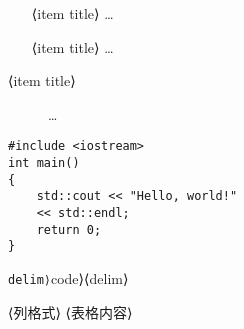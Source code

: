 \documentclass{ctexart}
\begin{document}


\begin{enumerate}
\item[⟨item title⟩] …
\end{enumerate}


\begin{itemize}
\item[⟨item title⟩] …
\end{itemize}

\begin{description}
\item[⟨item title⟩] …
\end{description}

\begin{flushleft}
\end{flushleft}

\begin{flushright}
\end{flushright}

\begin{center}
\end{center}

\begin{quote}
\end{quote}

\begin{quotation}
\end{quotation}

\begin{verse}
\end{verse}

\begin{abstract}
\end{abstract}


\begin{verbatim}
#include <iostream>
int main()
{
    std::cout << "Hello, world!"
    << std::endl;
    return 0;
}
\end{verbatim}
\verb⟨delim⟩⟨code⟩⟨delim⟩

\begin{tabular}{⟨列格式⟩}
  ⟨表格内容⟩
\end{tabular}



\end{document}
